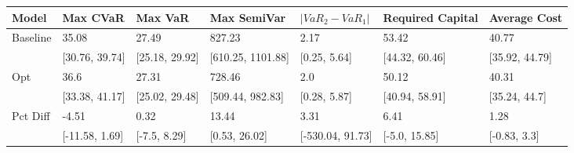 \begin{tabular}{lllllll}
\toprule
   Model &       Max CVaR &        Max VaR &       Max SemiVar & $|VaR_2 - VaR_1|$ & Required Capital &   Average Cost \\
\midrule
Baseline &          35.08 &          27.49 &            827.23 &              2.17 &            53.42 &          40.77 \\
         & [30.76, 39.74] & [25.18, 29.92] & [610.25, 1101.88] &      [0.25, 5.64] &   [44.32, 60.46] & [35.92, 44.79] \\
     Opt &           36.6 &          27.31 &            728.46 &               2.0 &            50.12 &          40.31 \\
         & [33.38, 41.17] & [25.02, 29.48] &  [509.44, 982.83] &      [0.28, 5.87] &   [40.94, 58.91] &  [35.24, 44.7] \\
Pct Diff &          -4.51 &           0.32 &             13.44 &              3.31 &             6.41 &           1.28 \\
         & [-11.58, 1.69] &   [-7.5, 8.29] &     [0.53, 26.02] &  [-530.04, 91.73] &    [-5.0, 15.85] &   [-0.83, 3.3] \\
\bottomrule
\end{tabular}
